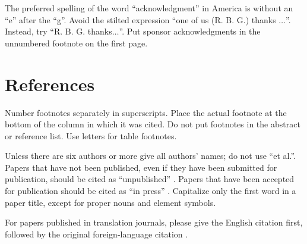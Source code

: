 \documentclass[conference]{IEEEtran}
\begin{document}
The preferred spelling of the word ``acknowledgment'' in America is without 
an ``e'' after the ``g''. Avoid the stilted expression ``one of us (R. B. 
G.) thanks $\ldots$''. Instead, try ``R. B. G. thanks$\ldots$''. Put sponsor 
acknowledgments in the unnumbered footnote on the first page.

\section*{References}


Number footnotes separately in superscripts. Place the actual footnote at 
the bottom of the column in which it was cited. Do not put footnotes in the 
abstract or reference list. Use letters for table footnotes.

Unless there are six authors or more give all authors' names; do not use 
``et al.''. Papers that have not been published, even if they have been 
submitted for publication, should be cited as ``unpublished'' \cite{b4}. Papers 
that have been accepted for publication should be cited as ``in press'' \cite{b5}. 
Capitalize only the first word in a paper title, except for proper nouns and 
element symbols.

For papers published in translation journals, please give the English 
citation first, followed by the original foreign-language citation \cite{b6}.
\end{document}
